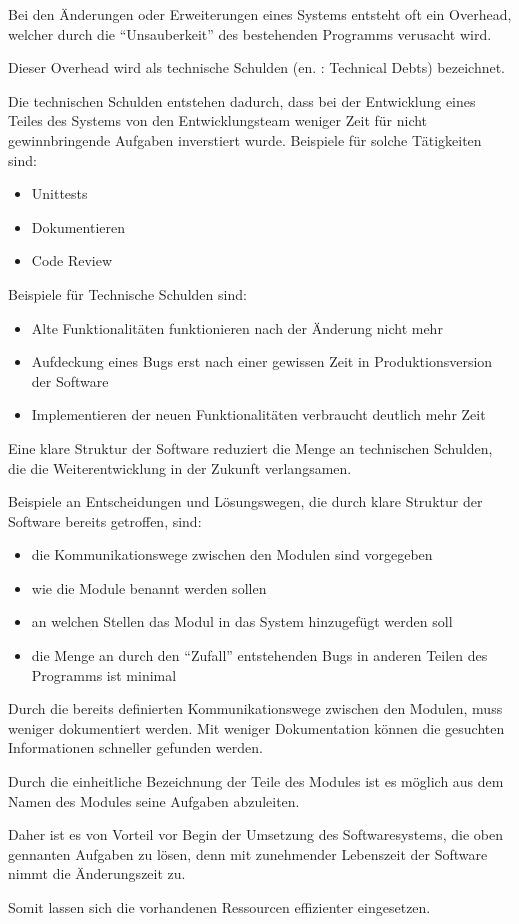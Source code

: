 Bei den Änderungen oder Erweiterungen eines Systems entsteht oft ein Overhead, welcher durch die ``Unsauberkeit'' des bestehenden Programms verusacht wird.

Dieser Overhead wird als technische Schulden (en. : Technical Debts) bezeichnet.

Die technischen Schulden entstehen dadurch, dass bei der Entwicklung eines Teiles des Systems
von den Entwicklungsteam weniger Zeit für nicht gewinnbringende Aufgaben inverstiert wurde.
Beispiele für solche Tätigkeiten sind:
\begin{itemize}
    \item Unittests
    \item Dokumentieren 
    \item Code Review
\end{itemize}

Beispiele für Technische Schulden sind:
\begin{itemize}
    \item Alte Funktionalitäten funktionieren nach der Änderung nicht mehr
    \item Aufdeckung eines Bugs erst nach einer gewissen Zeit in Produktionsversion der Software
    \item Implementieren der neuen Funktionalitäten verbraucht deutlich mehr Zeit
\end{itemize}

Eine klare Struktur der Software reduziert die Menge an technischen Schulden, 
die die Weiterentwicklung in der Zukunft verlangsamen. 


Beispiele an Entscheidungen und Lösungswegen, 
die durch klare Struktur der Software bereits getroffen, sind:

\begin{itemize}
    \item die Kommunikationswege zwischen den Modulen sind vorgegeben
    \item wie die Module benannt werden sollen
    \item an welchen Stellen das Modul in das System hinzugefügt werden soll
    \item die Menge an durch den ``Zufall'' entstehenden Bugs in anderen Teilen des Programms ist minimal
\end{itemize}

Durch die bereits definierten Kommunikationswege zwischen den Modulen, muss weniger dokumentiert werden.
Mit weniger Dokumentation können die gesuchten Informationen schneller gefunden werden.

Durch die einheitliche Bezeichnung der Teile des Modules ist es möglich aus dem Namen des Modules seine Aufgaben abzuleiten.

Daher ist es von Vorteil vor Begin der Umsetzung des Softwaresystems, die oben gennanten Aufgaben zu lösen,
denn mit zunehmender Lebenszeit der Software nimmt die Änderungszeit zu.

Somit lassen sich die vorhandenen Ressourcen effizienter eingesetzen.